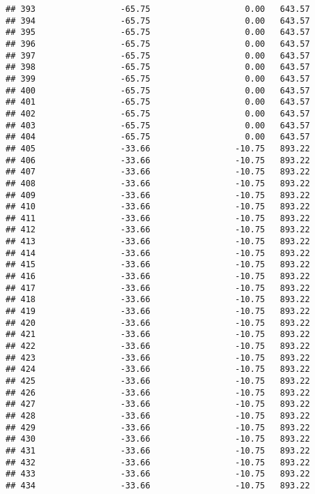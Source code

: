 \documentclass[]{article}
\begin{document}
\begin{verbatim}
## 393                 -65.75                   0.00   643.57
## 394                 -65.75                   0.00   643.57
## 395                 -65.75                   0.00   643.57
## 396                 -65.75                   0.00   643.57
## 397                 -65.75                   0.00   643.57
## 398                 -65.75                   0.00   643.57
## 399                 -65.75                   0.00   643.57
## 400                 -65.75                   0.00   643.57
## 401                 -65.75                   0.00   643.57
## 402                 -65.75                   0.00   643.57
## 403                 -65.75                   0.00   643.57
## 404                 -65.75                   0.00   643.57
## 405                 -33.66                 -10.75   893.22
## 406                 -33.66                 -10.75   893.22
## 407                 -33.66                 -10.75   893.22
## 408                 -33.66                 -10.75   893.22
## 409                 -33.66                 -10.75   893.22
## 410                 -33.66                 -10.75   893.22
## 411                 -33.66                 -10.75   893.22
## 412                 -33.66                 -10.75   893.22
## 413                 -33.66                 -10.75   893.22
## 414                 -33.66                 -10.75   893.22
## 415                 -33.66                 -10.75   893.22
## 416                 -33.66                 -10.75   893.22
## 417                 -33.66                 -10.75   893.22
## 418                 -33.66                 -10.75   893.22
## 419                 -33.66                 -10.75   893.22
## 420                 -33.66                 -10.75   893.22
## 421                 -33.66                 -10.75   893.22
## 422                 -33.66                 -10.75   893.22
## 423                 -33.66                 -10.75   893.22
## 424                 -33.66                 -10.75   893.22
## 425                 -33.66                 -10.75   893.22
## 426                 -33.66                 -10.75   893.22
## 427                 -33.66                 -10.75   893.22
## 428                 -33.66                 -10.75   893.22
## 429                 -33.66                 -10.75   893.22
## 430                 -33.66                 -10.75   893.22
## 431                 -33.66                 -10.75   893.22
## 432                 -33.66                 -10.75   893.22
## 433                 -33.66                 -10.75   893.22
## 434                 -33.66                 -10.75   893.22

\end{verbatim}
\end{document}
